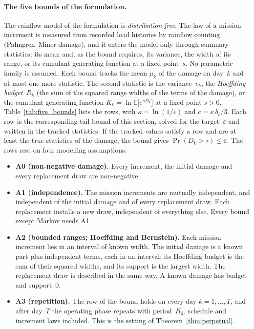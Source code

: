 \documentclass[11pt,a4paper]{article}
\theoremstyle{plain}
\theoremstyle{definition}
\theoremstyle{remark}
\begin{document}
\paragraph{The five bounds of the formulation.}
The rainflow model of the formulation is \emph{distribution-free}.
The law of a mission increment is measured from recorded load histories by rainflow counting (Palmgren--Miner damage), and it enters the model only through summary statistics: its mean and, as the bound requires, its variance, the width of its range, or its cumulant generating function at a fixed point~$s$.
No parametric family is assumed.
Each bound tracks the mean $\mu_k$ of the damage on day~$k$ and at most one more statistic.
The second statistic is the variance~$v_k$, the \emph{Hoeffding budget}~$R_k$ (the sum of the squared range widths of the terms of the damage), or the cumulant generating function $K_k = \ln\mathbb{E}\bigl[e^{sD_k}\bigr]$ at a fixed point $s > 0$.
Table~\ref{tab:five_bounds} lists the rows, with $\kappa = \ln(1/\varepsilon)$ and $c = \kappa\, b_\ell/3$.
Each row is the corresponding tail bound of this section, solved for the target~$\varepsilon$ and written in the tracked statistics.
If the tracked values satisfy a row and are at least the true statistics of the damage, the bound gives $\Pr(D_k > \tau) \le \varepsilon$.
The rows rest on four modelling assumptions.
\begin{itemize}[nosep]
  \item \textbf{A0 (non-negative damage).} Every increment, the initial damage and every replacement draw are non-negative.
  \item \textbf{A1 (independence).} The mission increments are mutually independent, and independent of the initial damage and of every replacement draw.
    Each replacement installs a new draw, independent of everything else.
    Every bound except Markov needs A1.
  \item \textbf{A2 (bounded ranges; Hoeffding and Bernstein).} Each mission increment lies in an interval of known width.
    The initial damage is a known part plus independent terms, each in an interval; its Hoeffding budget is the sum of their squared widths, and its support is the largest width.
    The replacement draw is described in the same way.
    A known damage has budget and support~$0$.
  \item \textbf{A3 (repetition).} The row of the bound holds on every day $k = 1, \ldots, T$, and after day~$T$ the operating phase repeats with period~$H_2$, schedule and increment laws included.
    This is the setting of Theorem~\ref{thm:perpetual}.
\end{itemize}
\end{document}
